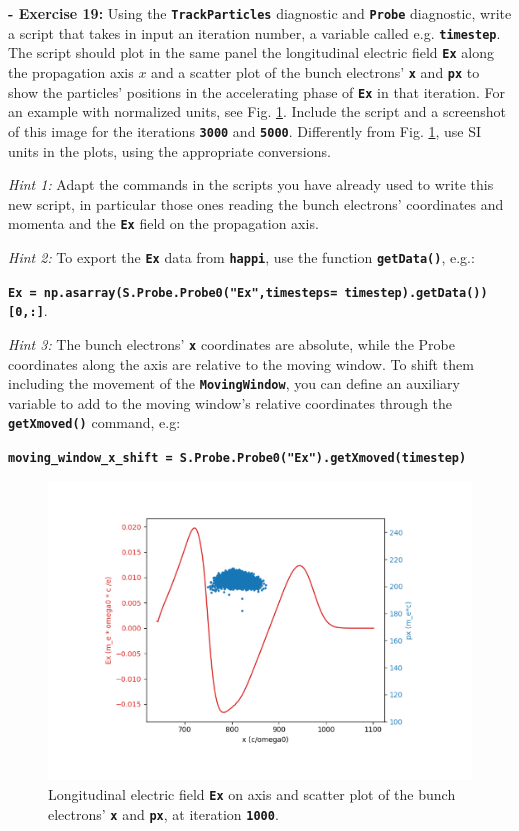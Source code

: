 \documentclass{article}
\newcommand{\commandline}[1]{\texttt{\textbf{#1}}}
\begin{document}
\textbf{- Exercise 19:} Using the \commandline{TrackParticles} diagnostic and \commandline{Probe} diagnostic, write a script that takes in input an iteration number, a variable called e.g. \commandline{timestep}. The script should plot in the same panel the longitudinal electric field \commandline{Ex} along the propagation axis $x$ and a scatter plot of the bunch electrons' \commandline{x} and \commandline{px} to show the particles' positions in the accelerating phase of \commandline{Ex} in that iteration. For an example with normalized units, see Fig. \ref{ExScatterXPx}. Include the script and a screenshot of this image for the iterations \commandline{3000} and \commandline{5000}.  Differently from Fig.  \ref{ExScatterXPx}, use SI units in the plots, using the appropriate conversions.

\textit{Hint 1:} Adapt the commands in the scripts you have already used to write this new script, in particular those ones reading the bunch electrons' coordinates and momenta and the \commandline{Ex} field on the propagation axis.

\textit{Hint 2:} To export the \commandline{Ex} data from \commandline{happi}, use the function \commandline{getData()}, e.g.:

\commandline{Ex = np.asarray(S.Probe.Probe0("Ex",timesteps= timestep).getData())[0,:]}.

\textit{Hint 3:} The bunch electrons' \commandline{x} coordinates are absolute, while the Probe coordinates along the axis are relative to the moving window. To shift them including the movement of the \commandline{MovingWindow}, you can define an auxiliary variable to add to the moving window's relative coordinates through the \commandline{getXmoved()} command, e.g:

\commandline{moving\_window\_x\_shift = S.Probe.Probe0("Ex").getXmoved(timestep)}
\\

\begin{figure}[h!]
  \begin{center}
  \includegraphics[scale=0.35]{ExScatterXPx.pdf}
  \end{center}
  \caption{Longitudinal electric field \commandline{Ex} on axis and scatter plot of the bunch electrons' \commandline{x} and \commandline{px}, at iteration \commandline{1000}. }
  \label{ExScatterXPx}
\end{figure}
\end{document}
